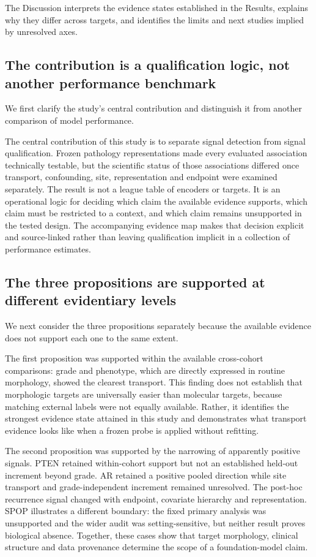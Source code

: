 The Discussion interprets the evidence states established in the Results, explains why they
differ across targets, and identifies the limits and next studies implied by unresolved
axes.

\subsection{The contribution is a qualification logic, not another performance benchmark}

We first clarify the study's central contribution and distinguish it from another comparison
of model performance.

The central contribution of this study is to separate signal detection from signal
qualification. Frozen pathology representations made every evaluated association
technically testable, but the scientific status of those associations differed once
transport, confounding, site, representation and endpoint were examined separately. The
result is not a league table of encoders or targets. It is an operational logic for deciding
which claim the available evidence supports, which claim must be restricted to a context,
and which claim remains unsupported in the tested design. The accompanying evidence map
makes that decision explicit and source-linked rather than leaving qualification implicit in
a collection of performance estimates.

\subsection{The three propositions are supported at different evidentiary levels}

We next consider the three propositions separately because the available evidence does not
support each one to the same extent.

The first proposition was supported within the available cross-cohort comparisons: grade
and phenotype, which are directly expressed in routine morphology, showed the clearest
transport. This finding does not establish that morphologic targets are universally easier
than molecular targets, because matching external labels were not equally available.
Rather, it identifies the strongest evidence state attained in this study and demonstrates
what transport evidence looks like when a frozen probe is applied without refitting.

The second proposition was supported by the narrowing of apparently positive signals.
PTEN retained within-cohort support but not an established held-out increment beyond grade.
AR retained a positive pooled direction while site transport and grade-independent
increment remained unresolved. The post-hoc recurrence signal changed with endpoint,
covariate hierarchy and representation. SPOP illustrates a different boundary: the fixed
primary analysis was unsupported and the wider audit was setting-sensitive, but neither
result proves biological absence. Together, these cases show that target morphology,
clinical structure and data provenance determine the scope of a foundation-model claim.

